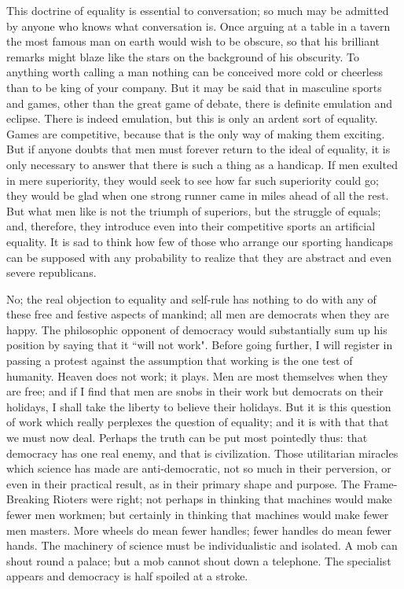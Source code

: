 \documentclass[final,10pt,letterpaper,twocolumn,openany]{book}
\begin{document}
This doctrine of equality is essential to conversation; so much may be
admitted by anyone who knows what conversation is. Once arguing at a
table in a tavern the most famous man on earth would wish to be obscure,
so that his brilliant remarks might blaze like the stars on the background of
his obscurity. To anything worth calling a man nothing can be conceived
more cold or cheerless than to be king of your company. But it may be
said that in masculine sports and games, other than the great game of
debate, there is definite emulation and eclipse. There is indeed emulation,
but this is only an ardent sort of equality. Games are competitive, because
that is the only way of making them exciting. But if anyone doubts that
men must forever return to the ideal of equality, it is only necessary to
answer that there is such a thing as a handicap. If men exulted in mere
superiority, they would seek to see how far such superiority could go; they
would be glad when one strong runner came in miles ahead of all the rest.
But what men like is not the triumph of superiors, but the struggle of
equals; and, therefore, they introduce even into their competitive sports an
artificial equality. It is sad to think how few of those who arrange our
sporting handicaps can be supposed with any probability to realize that
they are abstract and even severe republicans.

No; the real objection to equality and self-rule has nothing to do with
any of these free and festive aspects of mankind; all men are democrats
when they are happy. The philosophic opponent of democracy would
substantially sum up his position by saying that it ``will not work". Before
going further, I will register in passing a protest against the assumption
that working is the one test of humanity. Heaven does not work; it plays.
Men are most themselves when they are free; and if I find that men are
snobs in their work but democrats on their holidays, I shall take the liberty
to believe their holidays. But it is this question of work which really
perplexes the question of equality; and it is with that that we must now
deal. Perhaps the truth can be put most pointedly thus: that democracy has
one real enemy, and that is civilization. Those utilitarian miracles which
science has made are anti-democratic, not so much in their perversion, or
even in their practical result, as in their primary shape and purpose. The
Frame-Breaking Rioters were right; not perhaps in thinking that machines
would make fewer men workmen; but certainly in thinking that machines
would make fewer men masters. More wheels do mean fewer handles;
fewer handles do mean fewer hands. The machinery of science must be
individualistic and isolated. A mob can shout round a palace; but a mob
cannot shout down a telephone. The specialist appears and democracy is
half spoiled at a stroke.
\end{document}
